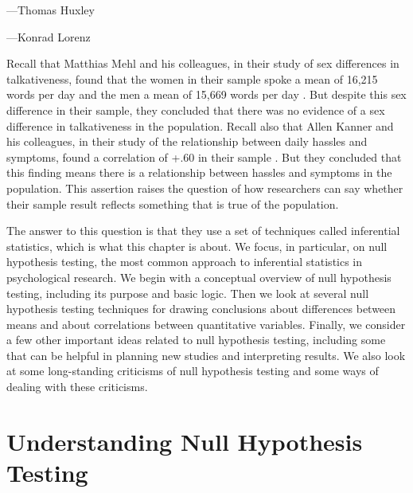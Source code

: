  {---Thomas Huxley}

 {---Konrad Lorenz}

Recall that Matthias Mehl and his colleagues, in their study of sex differences in talkativeness, found that the women in their sample spoke a mean of 16,215 words per day and the men a mean of 15,669 words per day \citep{mehl_are_2007}. But despite this sex difference in their sample, they concluded that there was no evidence of a sex difference in talkativeness in the population. Recall also that Allen Kanner and his colleagues, in their study of the relationship between daily hassles and symptoms, found a correlation of +.60 in their sample \citep{kanner_comparison_1981}. But they concluded that this finding means there is a relationship between hassles and symptoms in the population. This assertion raises the question of how researchers can say whether their sample result reflects something that is true of the population.


The answer to this question is that they use a set of techniques called inferential statistics, which is what this chapter is about. We focus, in particular, on null hypothesis testing, the most common approach to inferential statistics in psychological research. We begin with a conceptual overview of null hypothesis testing, including its purpose and basic logic. Then we look at several null hypothesis testing techniques for drawing conclusions about differences between means and about correlations between quantitative variables. Finally, we consider a few other important ideas related to null hypothesis testing, including some that can be helpful in planning new studies and interpreting results. We also look at some long-standing criticisms of null hypothesis testing and some ways of dealing with these criticisms.


\section{Understanding Null Hypothesis Testing}



